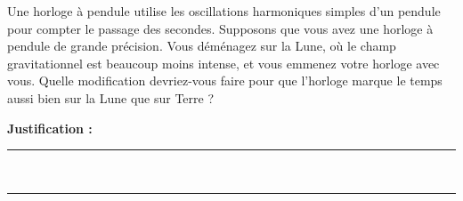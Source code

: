 Une horloge à pendule utilise les oscillations harmoniques simples d’un pendule pour compter le passage des secondes. Supposons que vous avez une horloge à pendule de grande précision. Vous déménagez sur la Lune, où le champ gravitationnel est beaucoup moins intense, et vous emmenez votre horloge avec vous. Quelle modification devriez-vous faire pour que l’horloge marque le temps aussi bien sur la Lune que sur Terre ?

\choices
\noindent\textbf{Justification :} \hrulefill \\[2.5ex]
\rule{\linewidth}{0.4pt} \\[2.5ex]
\rule{\linewidth}{0.4pt}
\vfill